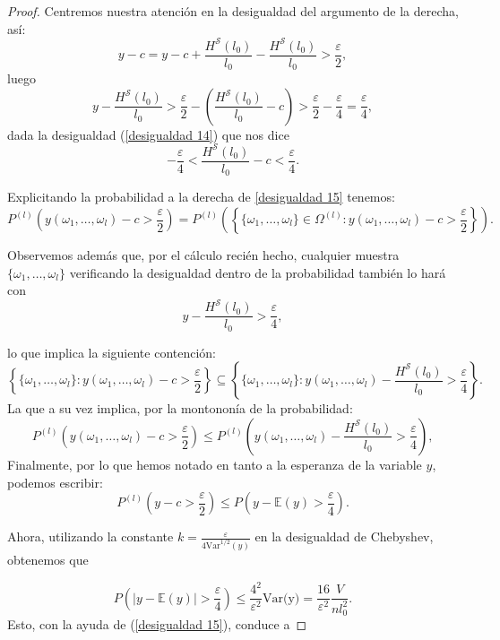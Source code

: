 \documentclass{report}
\begin{document}
\begin{proof}
    Centremos nuestra atención en la desigualdad del argumento de la derecha, así:
    \[
    y-c = y-c+\frac{H^{\mathcal{S}}(l_0)}{l_0}-\frac{H^{\mathcal{S}}(l_0)}{l_0} > \frac{\varepsilon}{2},
    \]
    luego
    \[
    y-\frac{H^{\mathcal{S}}(l_0)}{l_0} > \frac{\varepsilon}{2} - \left(\frac{H^{\mathcal{S}}(l_0)}{l_0}-c\right)>\frac{\varepsilon}{2} -\frac{\varepsilon}{4} = \frac{\varepsilon}{4},
    \]
    dada la desigualdad (\ref{desigualdad 14}) que nos dice
    \[
    -\frac{\varepsilon}{4}< \frac{H^{\mathcal{S}}(l_0)}{l_0} - c < \frac{\varepsilon}{4}.
    \]

    Explicitando la probabilidad a la derecha de \ref{desigualdad 15} tenemos:
      \[
        P^{(l)}\left( y(\omega_1,\ldots,\omega_l) - c > \frac{\varepsilon}{2} \right) = P^{(l)}\left(\left\{\{\omega_1,\ldots,\omega_l\}\in\Omega^{(l)}: y(\omega_1,\ldots,\omega_l) - c > \frac{\varepsilon}{2} \right\}\right).
    \]
    
    Observemos además que, por el cálculo recién hecho, cualquier muestra $\{\omega_1,\ldots,\omega_l\}$ verificando la desigualdad dentro de la probabilidad también
    lo hará con
    \[
    y-\frac{H^{\mathcal{S}}(l_0)}{l_0} > \frac{\varepsilon}{4},
    \]
    
    lo que implica la siguiente contención:
    \[
        \left\{\{\omega_1,\ldots,\omega_l\}: y(\omega_1,\ldots,\omega_l) - c
        > \frac{\varepsilon}{2} \right\} \subseteq   \left\{\{\omega_1,\ldots,\omega_l\}: y(\omega_1,\ldots,\omega_l) - \frac{H^{\mathcal{S}}(l_0)}{l_0} > \frac{\varepsilon}{4} \right\}.
    \]
    La que a su vez implica, por la montononía de la probabilidad:
    \[
    P^{(l)}\left( y(\omega_1,\ldots,\omega_l) - c > \frac{\varepsilon}{2} \right) 
    \leq P^{(l)}\left( y(\omega_1,\ldots,\omega_l) - \frac{H^{\mathcal{S}}(l_0)}{l_0} > \frac{\varepsilon}{4} \right),
    \]
    Finalmente, por lo que hemos notado en tanto a la esperanza de la variable $y$, podemos escribir:
    \[
        P^{(l)}\left( y - c > \frac{\varepsilon}{2} \right) 
        \leq P\left( y - \mathbb{E}(y) > \frac{\varepsilon}{4} \right).
    \]

    Ahora, utilizando la constante \( k = \frac{\varepsilon}{4\text{Var}^{1/2}(y)} \) en la desigualdad de Chebyshev, obtenemos que

    \[P\left( |y - \mathbb{E}(y)| > \frac{\varepsilon}{4} \right) \leq \frac{4^2}{\varepsilon^2}\text{Var(y)} =  \frac{16}{\varepsilon^2}\frac{V}{n l_0^2}.\]
    Esto, con la ayuda de (\ref{desigualdad 15}), conduce a


\end{proof}
\end{document}
